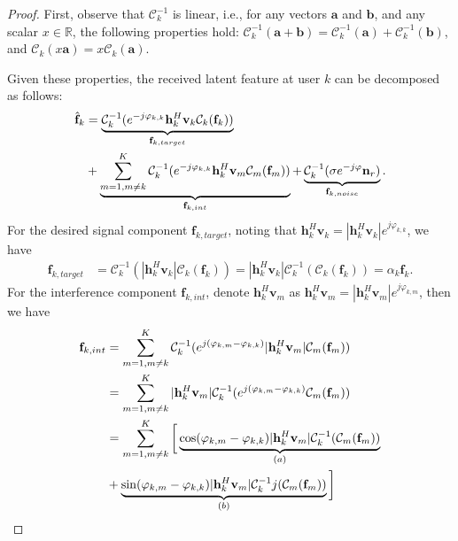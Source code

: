 \documentclass[10pt,a4paper]{amsart}
\def\phi{\varphi}
\begin{document}
\begin{proof}
    First, observe that $\mathcal{C}_k^{-1}$ is linear, i.e., for any vectors $\mathbf{a}$ and $\mathbf{b}$, and any scalar $x\in \mathbb{R}$,  the following properties hold:
    $\mathcal{C}_k^{-1}(\mathbf{a}+\mathbf{b})=\mathcal{C}_k^{-1}(\mathbf{a})+\mathcal{C}_k^{-1}(\mathbf{b})$, and $\mathcal{C}_k(x\mathbf{a})=x\mathcal{C}_k(\mathbf{a})$. 
   
   Given these properties, the received latent feature at user $k$ can be decomposed as follows: 
   \begin{align}
   \hat{\mathbf{f}}_k&=\underbrace{\mathcal{C}_k^{-1}(e^{-j\phi_{k,k}}\mathbf{h}_k^H\mathbf{v}_k\mathcal{C}_k(\mathbf{f}_k))}_{\mathbf{f}_{k,target}}\notag\\&+\underbrace{\sum_{m=1,m\neq k}^K \mathcal{C}_k^{-1}(e^{-j\phi_{k,k}}\mathbf{h}_k^H\mathbf{v}_m\mathcal{C}_m(\mathbf{f}_m))}_{\mathbf{f}_{k,int}}+\underbrace{\mathcal{C}_k^{-1}(\sigma e^{-j\phi} \mathbf{n}_{r})}_{\mathbf{f}_{k,noise}}.
   \end{align}
   For the desired signal component $\mathbf{f}_{k,target}$, noting that $\mathbf{h}_k^H\mathbf{v}_k=|\mathbf{h}_k^H\mathbf{v}_k|e^{j\phi_{k,k}}$, we have 
   \begin{align}
   \mathbf{f}_{k,target}&=\mathcal{C}_k^{-1}(|\mathbf{h}_k^H\mathbf{v}_k|\mathcal{C}_k(\mathbf{f}_k))=|\mathbf{h}_k^H\mathbf{v}_k|\mathcal{C}_k^{-1}(\mathcal{C}_k(\mathbf{f}_k))=\alpha_k\mathbf{f}_k.
   \end{align}
   For the interference component $\mathbf{f}_{k,int}$, denote $\mathbf{h}_k^H\mathbf{v}_m$ as $\mathbf{h}_k^H\mathbf{v}_m=|\mathbf{h}_k^H\mathbf{v}_m|e^{j\phi_{k,m}}$, then we have 
   \vspace{-3mm}
   \begin{align}
   \mathbf{f}_{k,int}&=\sum_{m=1,m\neq k}^K\mathcal{C}_k^{-1}(e^{j(\phi_{k,m}-\phi_{k,k})}|\mathbf{h}_k^H\mathbf{v}_m|\mathcal{C}_m(\mathbf{f}_m))\\&=\sum_{m=1,m\neq k}^K |\mathbf{h}_k^H\mathbf{v}_m|\mathcal{C}_k^{-1}(e^{j(\phi_{k,m}-\phi_{k,k})}\mathcal{C}_m(\mathbf{f}_m))\\
   &=\sum_{m=1,m\neq k}^K{\bigg[}\underbrace{\cos(\phi_{k,m}-\phi_{k,k})|\mathbf{h}_k^H\mathbf{v}_m|\mathcal{C}_{k}^{-1}(\mathcal{C}_m(\mathbf{f}_m))}_{(a)}\notag\\&+\underbrace{\sin(\phi_{k,m}-\phi_{k,k})|\mathbf{h}_k^H\mathbf{v}_m|\mathcal{C}_{k}^{-1}j(\mathcal{C}_m(\mathbf{f}_m))}_{(b)}{\bigg]}

\end{align}
\end{proof}
\end{document}
